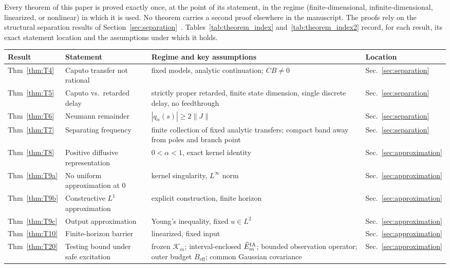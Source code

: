 
Every theorem of this paper is proved exactly once, at the point of its statement, in the regime (finite-dimensional, infinite-dimensional, linearized, or nonlinear) in which it is used. No theorem carries a second proof elsewhere in the manuscript. The proofs rely on the structural separation results of Section~\ref{sec:separation}~\cite{F02,F03,F04,F08,K01,K02,S01,S02}. Tables~\ref{tab:theorem_index} and~\ref{tab:theorem_index2} record, for each result, its exact statement location and the assumptions under which it holds.

\begin{table}[ht]
  \centering
  \scriptsize
  \begin{tabular}{p{1.15cm}p{2.1cm}p{4.85cm}p{1.95cm}}
    \hline
    Result & Statement & Regime and key assumptions & Location \\
    \hline
    Thm~\ref{thm:T4} & Caputo transfer not rational & fixed models, analytic continuation; $CB\neq 0$ & Sec.~\ref{sec:separation} \\
    Thm~\ref{thm:T5} & Caputo vs.\ retarded delay & strictly proper retarded, finite state dimension, single discrete delay, no feedthrough & Sec.~\ref{sec:separation} \\
    Thm~\ref{thm:T6} & Neumann remainder & $|q_\alpha(s)|\ge 2\|J\|$ & Sec.~\ref{sec:separation} \\
    Thm~\ref{thm:T7} & Separating frequency & finite collection of fixed analytic transfers; compact band away from poles and branch point & Sec.~\ref{sec:separation} \\
    Thm~\ref{thm:T8} & Positive diffusive representation & $0<\alpha<1$, exact kernel identity & Sec.~\ref{sec:approximation} \\
    Thm~\ref{thm:T9a} & No uniform approximation at $0$ & kernel singularity, $L^\infty$ norm & Sec.~\ref{sec:approximation} \\
    Thm~\ref{thm:T9b} & Constructive $L^1$ approximation & explicit construction, finite horizon & Sec.~\ref{sec:approximation} \\
    Thm~\ref{thm:T9c} & Output approximation & Young's inequality, fixed $u\in L^2$ & Sec.~\ref{sec:approximation} \\
    Thm~\ref{thm:T10} & Finite-horizon barrier & linearized, fixed input & Sec.~\ref{sec:approximation} \\
    Thm~\ref{thm:T20} & Testing bound under safe excitation & frozen $\mathcal K_m$; interval-enclosed $\widehat E_m^{\rm IA}$; bounded observation operator; outer budget $B_{\mathrm{eff}}$; common Gaussian covariance & Sec.~\ref{sec:approximation} \\

\end{tabular}
\end{table}
